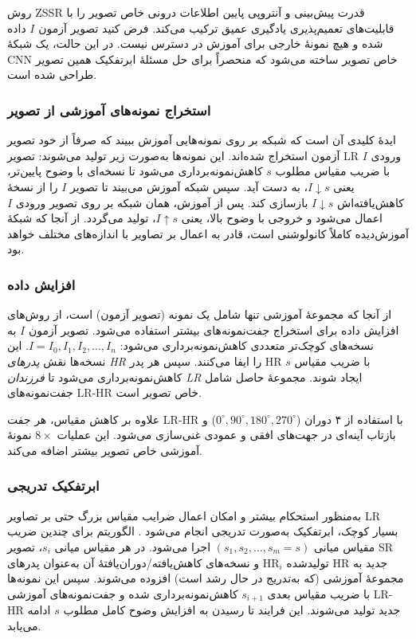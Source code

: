 روش ZSSR قدرت پیش‌بینی و آنتروپی پایین اطلاعات درونی خاص تصویر را با
قابلیت‌های تعمیم‌پذیری یادگیری عمیق ترکیب می‌کند. فرض کنید تصویر
آزمون $I$ داده شده و هیچ نمونهٔ خارجی برای آموزش در دسترس نیست.
در این حالت، یک شبکهٔ CNN خاص تصویر ساخته می‌شود که منحصراً
برای حل مسئلهٔ ابرتفکیک همین تصویر طراحی شده است.

\subsubsection{استخراج نمونه‌های آموزشی از تصویر}

ایدهٔ کلیدی آن است که شبکه بر روی نمونه‌هایی آموزش ببیند که صرفاً
از خود تصویر آزمون استخراج شده‌اند. این نمونه‌ها به‌صورت زیر تولید
می‌شوند: تصویر LR ورودی $I$ با ضریب مقیاس مطلوب $s$ کاهش‌نمونه‌برداری
می‌شود تا نسخه‌ای با وضوح پایین‌تر، یعنی $I{\downarrow s}$، به دست آید.
سپس شبکه آموزش می‌بیند تا تصویر $I$ را از نسخهٔ کاهش‌یافته‌اش
$I{\downarrow s}$ بازسازی کند. پس از آموزش، همان شبکه بر روی تصویر
ورودی $I$ اعمال می‌شود و خروجی با وضوح بالا، یعنی $I{\uparrow s}$،
تولید می‌گردد. از آنجا که شبکهٔ آموزش‌دیده کاملاً کانولوشنی است،
قادر به اعمال بر تصاویر با اندازه‌های مختلف خواهد بود.

\subsubsection{افزایش داده}

از آنجا که مجموعهٔ آموزشی تنها شامل یک نمونه (تصویر آزمون) است، از
روش‌های افزایش داده برای استخراج جفت‌نمونه‌های بیشتر استفاده می‌شود.
تصویر آزمون $I$ به نسخه‌های کوچک‌تر متعددی کاهش‌نمونه‌برداری می‌شود:
$I = I_0, I_1, I_2, \ldots, I_n$. این نسخه‌ها نقش
\emph{پدرهای HR} را ایفا می‌کنند. سپس هر
پدر HR با ضریب مقیاس $s$ کاهش‌نمونه‌برداری می‌شود تا
\emph{فرزندان LR} ایجاد شوند. مجموعهٔ حاصل شامل
جفت‌نمونه‌های LR-HR خاص تصویر است.

علاوه بر کاهش مقیاس، هر جفت LR-HR با استفاده از ۴ دوران
($0^\circ, 90^\circ, 180^\circ, 270^\circ$) و بازتاب آینه‌ای در
جهت‌های افقی و عمودی غنی‌سازی می‌شود. این عملیات $8\times$ نمونهٔ
آموزشی خاص تصویر بیشتر اضافه می‌کند.

\subsubsection{ابرتفکیک تدریجی}

به‌منظور استحکام بیشتر و امکان اعمال ضرایب مقیاس بزرگ حتی بر تصاویر
LR بسیار کوچک، ابرتفکیک به‌صورت تدریجی انجام می‌شود
\cite{glasner2009sr, timofte2016seven}. الگوریتم برای چندین ضریب مقیاس
میانی $(s_1, s_2, \ldots, s_m = s)$ اجرا می‌شود. در هر مقیاس میانی
$s_i$، تصویر SR تولیدشده $\text{HR}_i$ و نسخه‌های
کاهش‌یافته/دوران‌یافتهٔ آن به‌عنوان پدرهای HR جدید به مجموعهٔ
آموزشی (که به‌تدریج در حال رشد است) افزوده می‌شوند. سپس این نمونه‌ها
با ضریب مقیاس بعدی $s_{i+1}$ کاهش‌نمونه‌برداری شده و جفت‌نمونه‌های
آموزشی LR-HR جدید تولید می‌شوند. این فرایند تا رسیدن به افزایش
وضوح کامل مطلوب $s$ ادامه می‌یابد.

